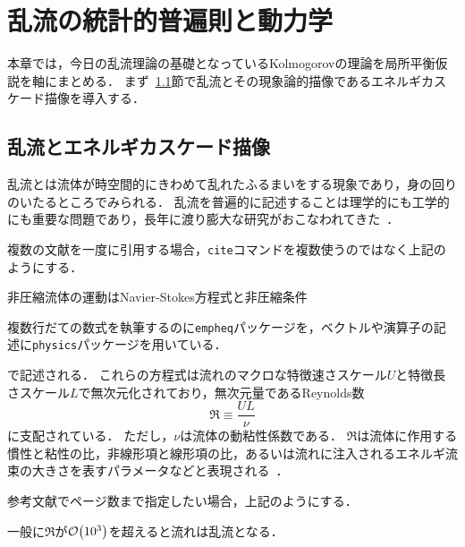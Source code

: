 \chapter{乱流の統計的普遍則と動力学}
\label{chap:StatisticalUniversalityAndDynamicsOfTurbulence}

本章では，今日の乱流理論の基礎となっているKolmogorovの理論を局所平衡仮説を軸にまとめる．
まず~\ref{sec:TurbulenceAndEnergyCascadePicture}節で乱流とその現象論的描像であるエネルギカスケード描像を導入する．


\section{乱流とエネルギカスケード描像}
\label{sec:TurbulenceAndEnergyCascadePicture}

乱流とは流体が時空間的にきわめて乱れたふるまいをする現象であり，身の回りのいたるところでみられる．
乱流を普遍的に記述することは理学的にも工学的にも重要な問題であり，長年に渡り膨大な研究がおこなわれてきた~\cite{tennekes1972first,Landau1987Fluid,KidaYanase,frisch1995tlk}．
\begin{tcolorbox}
  複数の文献を一度に引用する場合，\texttt{cite}コマンドを複数使うのではなく上記のようにする．
\end{tcolorbox}

非圧縮流体の運動はNavier-Stokes方程式と非圧縮条件
\begin{tcolorbox}
  複数行だての数式を執筆するのに\texttt{empheq}パッケージを，ベクトルや演算子の記述に\texttt{physics}パッケージを用いている．
\end{tcolorbox}
で記述される．
これらの方程式は流れのマクロな特徴速さスケール\(U\)と特徴長さスケール\(L\)で無次元化されており，無次元量であるReynolds数
\begin{equation}
  \Re \equiv \frac{UL}{\nu}
  \label{eq:LEHASU_DefOfReynoldsNumber}
\end{equation}
に支配されている．
ただし，\(\nu\)は流体の動粘性係数である．
\(\Re\)は流体に作用する慣性と粘性の比，非線形項と線形項の比，あるいは流れに注入されるエネルギ流束の大きさを表すパラメータなどと表現される~\cite[p.~8, p.~409]{Tatsumi}．
\begin{tcolorbox}
  参考文献でページ数まで指定したい場合，上記のようにする．
\end{tcolorbox}
一般に\(\Re\)が\(\order{10^3}\)を超えると流れは乱流となる．

